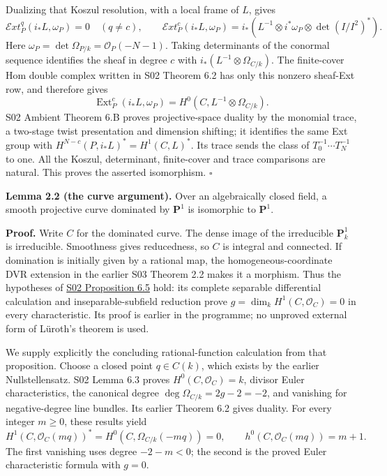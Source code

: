 \documentclass[11pt,a4paper,openany]{report}
\begin{document}
Dualizing that Koszul resolution, with a local frame of \(L\), gives \[
\mathcal E xt^q_P(i_*L,\omega_P)=0\quad(q\ne c),
\qquad
\mathcal E xt^c_P(i_*L,\omega_P)
=i_*(L^{-1}\otimes i^*\omega_P\otimes\det(I/I^2)^*).
\] Here \(\omega_P=\det\Omega_{P/k}=\mathcal O_P(-N-1)\). Taking determinants of the conormal sequence identifies the sheaf in degree \(c\) with \(i_*(L^{-1}\otimes\Omega_{C/k})\). The finite-cover Hom double complex written in S02 Theorem 6.2 has only this nonzero sheaf-Ext row, and therefore gives \[
\operatorname{Ext}^c_P(i_*L,\omega_P)
=H^0(C,L^{-1}\otimes\Omega_{C/k}).
\] S02 Ambient Theorem 6.B proves projective-space duality by the monomial trace, a two-stage twist presentation and dimension shifting; it identifies the same Ext group with \(H^{N-c}(P,i_*L)^*=H^1(C,L)^*\). Its trace sends the class of \(T_0^{-1}\cdots T_N^{-1}\) to one. All the Koszul, determinant, finite-cover and trace comparisons are natural. This proves the asserted isomorphism. \(\square\)

\textbf{Lemma 2.2 (the curve argument).} Over an algebraically closed field, a smooth projective curve dominated by \(\mathbf P^1\) is isomorphic to \(\mathbf P^1\).

\textbf{Proof.} Write \(C\) for the dominated curve. The dense image of the irreducible \(\mathbf P^1_k\) is irreducible. Smoothness gives reducedness, so \(C\) is integral and connected. If domination is initially given by a rational map, the homogeneous-coordinate DVR extension in the earlier S03 Theorem 2.2 makes it a morphism. Thus the hypotheses of \href{https://github.com/KokunoYumeto/open-math-courses/blob/main/docs/courses/AG-RG/AG-RG-S02.md}{S02 Proposition 6.5} hold: its complete separable differential calculation and inseparable-subfield reduction prove \(g=\dim_kH^1(C,\mathcal O_C)=0\) in every characteristic. Its proof is earlier in the programme; no unproved external form of Lüroth's theorem is used.

We supply explicitly the concluding rational-function calculation from that proposition. Choose a closed point \(q\in C(k)\), which exists by the earlier Nullstellensatz. S02 Lemma 6.3 proves \(H^0(C,\mathcal O_C)=k\), divisor Euler characteristics, the canonical degree \(\deg\Omega_{C/k}=2g-2=-2\), and vanishing for negative-degree line bundles. Its earlier Theorem 6.2 gives duality. For every integer \(m\ge0\), these results yield \[
 H^1(C,\mathcal O_C(mq))^*
   =H^0(C,\Omega_{C/k}(-mq))=0,
 \qquad
 h^0(C,\mathcal O_C(mq))=m+1.
\] The first vanishing uses degree \(-2-m<0\); the second is the proved Euler characteristic formula with \(g=0\).
\end{document}
